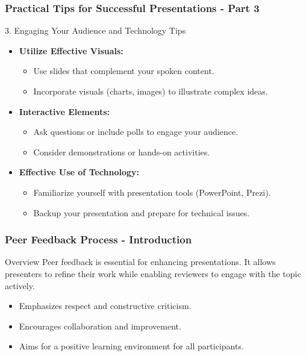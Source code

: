 \documentclass[aspectratio=169]{beamer}
\begin{document}
\begin{frame}[fragile]
    \frametitle{Practical Tips for Successful Presentations - Part 3}
    \begin{block}{3. Engaging Your Audience and Technology Tips}
        \begin{itemize}
            \item \textbf{Utilize Effective Visuals:}
            \begin{itemize}
                \item Use slides that complement your spoken content.
                \item Incorporate visuals (charts, images) to illustrate complex ideas.
            \end{itemize}
            
            \item \textbf{Interactive Elements:}
            \begin{itemize}
                \item Ask questions or include polls to engage your audience.
                \item Consider demonstrations or hands-on activities.
            \end{itemize}
            
            \item \textbf{Effective Use of Technology:}
            \begin{itemize}
                \item Familiarize yourself with presentation tools (PowerPoint, Prezi).
                \item Backup your presentation and prepare for technical issues.
            \end{itemize}
        \end{itemize}
    \end{block}
\end{frame}

\begin{frame}[fragile]
    \frametitle{Peer Feedback Process - Introduction}
    \begin{block}{Overview}
        Peer feedback is essential for enhancing presentations. It allows presenters to refine their work while enabling reviewers to engage with the topic actively.
    \end{block}
    \begin{itemize}
        \item Emphasizes respect and constructive criticism.
        \item Encourages collaboration and improvement.
        \item Aims for a positive learning environment for all participants.
    \end{itemize}
\end{frame}
\end{document}
